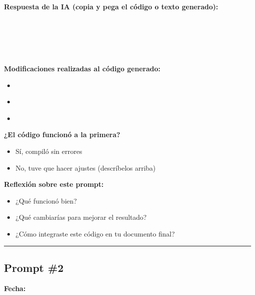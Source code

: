 \textbf{Respuesta de la IA (copia y pega el código o texto generado):}
\begin{verbatim}





\end{verbatim}

\textbf{Modificaciones realizadas al código generado:}
\begin{itemize}
    \item \underline{\hspace{10cm}}
    \item \underline{\hspace{10cm}}
    \item \underline{\hspace{10cm}}
\end{itemize}

\textbf{¿El código funcionó a la primera?}
\begin{itemize}
    \item[ ] Sí, compiló sin errores
    \item[ ] No, tuve que hacer ajustes (descríbelos arriba)
\end{itemize}

\textbf{Reflexión sobre este prompt:}
\begin{itemize}
    \item ¿Qué funcionó bien?
    \underline{\hspace{10cm}}
    
    \item ¿Qué cambiarías para mejorar el resultado?
    \underline{\hspace{10cm}}
    
    \item ¿Cómo integraste este código en tu documento final?
    \underline{\hspace{10cm}}
\end{itemize}

\vspace{0.5cm}
\rule{\textwidth}{0.5pt}
\vspace{0.5cm}

\subsection*{Prompt \#2}

\textbf{Fecha:} \underline{\hspace{5cm}}

